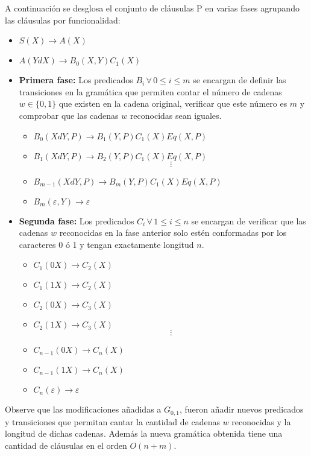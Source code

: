 A continuación se desglosa el conjunto de cláusulas P en varias fases agrupando las cláusulas por funcionalidad:
\begin{itemize}
    \item  $S(X)\to A(X)$
    \item $A(YdX)\to B_0(X,Y)C_1(X)$
    \item \textbf{Primera fase:} Los predicados $B_i\,\forall\,0\leq i\leq m$ se encargan de definir las transiciones en la gramática
          que permiten contar el número de cadenas $w\in \{0,1\}$ que existen en la cadena original, verificar que
          este número es $m$ y comprobar que las cadenas $w$ reconocidas sean iguales.
          \begin{itemize}
              \item $B_0(XdY,P)\to B_1(Y,P) C_1(X) Eq(X,P)$
              \item $B_1(XdY,P)\to B_2(Y,P) C_1(X) Eq(X,P)$
                    $$\vdots$$
              \item $B_{m-1}(XdY,P)\to B_m(Y,P) C_1(X) Eq(X,P)$
              \item $B_m(\varepsilon,Y)\to \varepsilon$
          \end{itemize}
    \item \textbf{Segunda fase:} Los predicados $C_i\,\forall\,1\leq i\leq n$ se encargan de verificar que las
          cadenas $w$ reconocidas en la fase anterior solo estén conformadas por los caracteres 0 ó 1 y tengan exactamente
          longitud $n$.
          \begin{itemize}
              \item $C_1(0X)\to C_2(X)$
              \item $C_1(1X)\to C_2(X)$
              \item $C_2(0X)\to C_3(X)$
              \item $C_2(1X)\to C_3(X)$
                    $$\vdots$$
              \item $C_{n-1}(0X)\to C_n(X)$
              \item $C_{n-1}(1X)\to C_n(X)$
              \item $C_n(\varepsilon)\to \varepsilon$
          \end{itemize}
\end{itemize}

Observe que las modificaciones añadidas a $G_{0,1}$, fueron añadir nuevos predicados y transiciones que permitan
cantar la cantidad de cadenas $w$ reconocidas y la longitud de dichas cadenas. Además la nueva gramática obtenida
tiene una cantidad de cláusulas en el orden $O(n+m)$.

